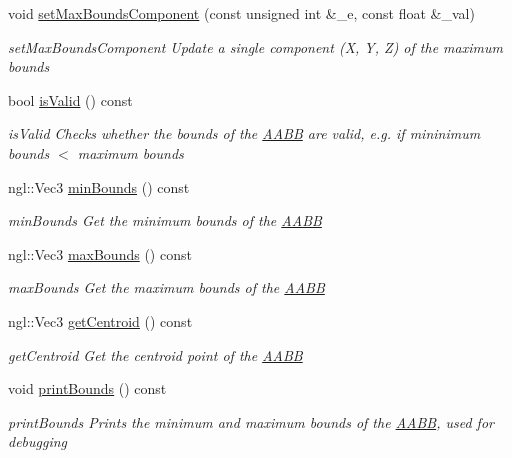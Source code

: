 \begin{DoxyCompactItemize}
void \hyperlink{classAABB_a0b491a795548caa55ea4fe47c8a495db}{set\-Max\-Bounds\-Component} (const unsigned int \&\-\_\-e, const float \&\-\_\-val)
\begin{DoxyCompactList}\small\item\em set\-Max\-Bounds\-Component Update a single component (X, Y, Z) of the maximum bounds \end{DoxyCompactList}\item 
bool \hyperlink{classAABB_a42e70d9ad1af51776feb24e8c2e49208}{is\-Valid} () const 
\begin{DoxyCompactList}\small\item\em is\-Valid Checks whether the bounds of the \hyperlink{classAABB}{A\-A\-B\-B} are valid, e.\-g. if mininimum bounds $<$ maximum bounds \end{DoxyCompactList}\item 
ngl\-::\-Vec3 \hyperlink{classAABB_ab362ab2ada4f93f8cbda2caa270af853}{min\-Bounds} () const 
\begin{DoxyCompactList}\small\item\em min\-Bounds Get the minimum bounds of the \hyperlink{classAABB}{A\-A\-B\-B} \end{DoxyCompactList}\item 
ngl\-::\-Vec3 \hyperlink{classAABB_a78d80ad6405f8cf0d77b037ab602fb67}{max\-Bounds} () const 
\begin{DoxyCompactList}\small\item\em max\-Bounds Get the maximum bounds of the \hyperlink{classAABB}{A\-A\-B\-B} \end{DoxyCompactList}\item 
ngl\-::\-Vec3 \hyperlink{classAABB_ae5f76545e4c7be6e345fb13ffe541694}{get\-Centroid} () const 
\begin{DoxyCompactList}\small\item\em get\-Centroid Get the centroid point of the \hyperlink{classAABB}{A\-A\-B\-B} \end{DoxyCompactList}\item 
\hypertarget{classAABB_a5a04ca82adf699f362e91a7e4fc27af2}{void \hyperlink{classAABB_a5a04ca82adf699f362e91a7e4fc27af2}{print\-Bounds} () const }\label{classAABB_a5a04ca82adf699f362e91a7e4fc27af2}

\begin{DoxyCompactList}\small\item\em print\-Bounds Prints the minimum and maximum bounds of the \hyperlink{classAABB}{A\-A\-B\-B}, used for debugging \end{DoxyCompactList}\end{DoxyCompactItemize}


